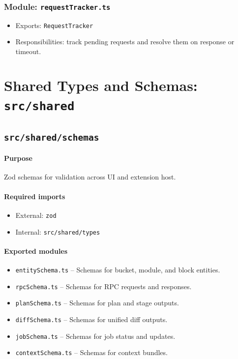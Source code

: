 \documentclass[11pt]{article}
\begin{document}
\subsubsection*{Module: \texttt{requestTracker.ts}}
\begin{itemize}[noitemsep]
  \item Exports: \texttt{RequestTracker}
  \item Responsibilities: track pending requests and resolve them on response or timeout.
\end{itemize}

\section{Shared Types and Schemas: \texttt{src/shared}}

\subsection{\texttt{src/shared/schemas}}
\paragraph{Purpose} Zod schemas for validation across UI and extension host.

\paragraph{Required imports}
\begin{itemize}[noitemsep]
  \item External: \texttt{zod}
  \item Internal: \texttt{src/shared/types}
\end{itemize}

\paragraph{Exported modules}
\begin{itemize}[noitemsep]
  \item \texttt{entitySchema.ts} -- Schemas for bucket, module, and block entities.
  \item \texttt{rpcSchema.ts} -- Schemas for RPC requests and responses.
  \item \texttt{planSchema.ts} -- Schemas for plan and stage outputs.
  \item \texttt{diffSchema.ts} -- Schemas for unified diff outputs.
  \item \texttt{jobSchema.ts} -- Schemas for job status and updates.
  \item \texttt{contextSchema.ts} -- Schemas for context bundles.
\end{itemize}
\end{document}
